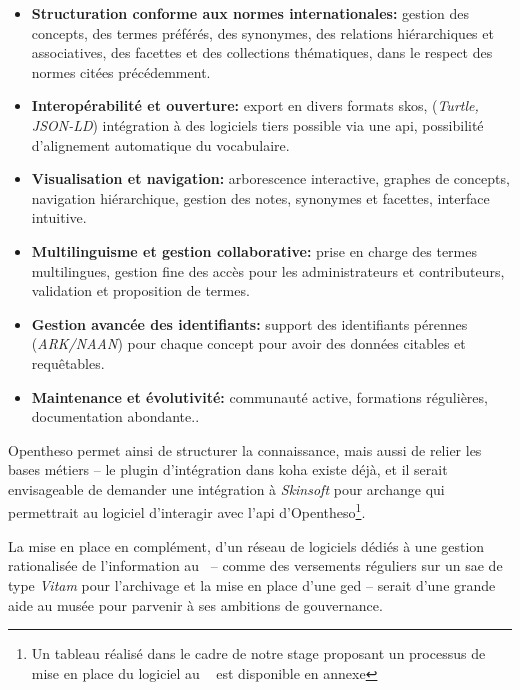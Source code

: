 \begin{itemize}
	
	\item \textbf{Structuration conforme aux normes internationales:} gestion des concepts, des termes préférés, des synonymes, des relations hiérarchiques et associatives, des facettes et des collections thématiques, dans le respect des normes citées précédemment.
	
	\item \textbf{Interopérabilité et ouverture:} export en divers formats \gls{skos}, (\textit{Turtle, JSON-LD}) intégration à des logiciels tiers possible via une \ac{api}, possibilité d'alignement automatique du vocabulaire.
	
	\item \textbf{Visualisation et navigation:} arborescence interactive, graphes de concepts, navigation hiérarchique, gestion des notes, synonymes et facettes, interface intuitive.
	
	\item \textbf{Multilinguisme et gestion collaborative:} prise en charge des termes multilingues, gestion fine des accès pour les administrateurs et contributeurs, validation et proposition de termes.
	
	\item \textbf{Gestion avancée des identifiants:} support des identifiants pérennes (\textit{ARK/NAAN}) pour chaque concept pour avoir des données citables et requêtables.
	
	\item \textbf{Maintenance et évolutivité:} communauté active, formations régulières, documentation abondante..
	
\end{itemize}





Opentheso permet ainsi de structurer la connaissance, mais aussi de relier les bases métiers – le plugin d'intégration dans \gls{koha} existe déjà, et il serait envisageable de demander une intégration à \textit{Skinsoft} pour \gls{archange} qui permettrait au logiciel d'interagir avec l'\ac{api} d'Opentheso\footnote{Un tableau réalisé dans le cadre de notre stage proposant un processus de mise en place du logiciel au \mae~ est disponible en annexe }.



La mise en place en complément, d'un réseau de logiciels dédiés à une gestion rationalisée de l'information au \mae~-- comme des versements réguliers sur un \gls{sae} de type \textit{Vitam} pour l’archivage et la mise en place d'une \gls{ged} – serait d'une grande aide au musée pour parvenir à ses ambitions de gouvernance.



